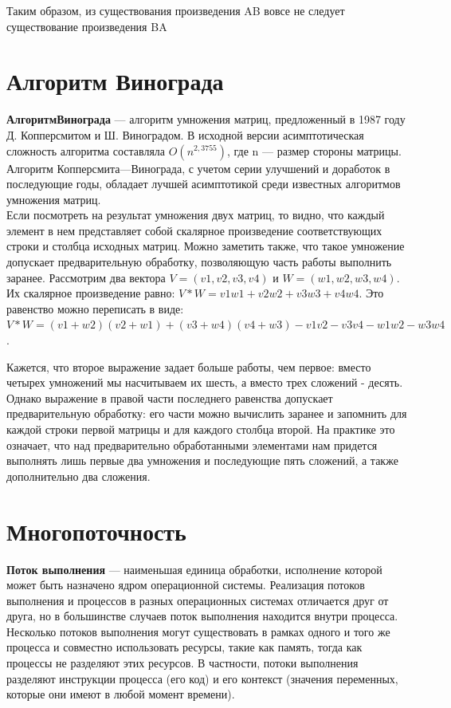 \documentclass[a4paper,12pt]{report}
\begin{document}
Таким образом, из существования произведения AB вовсе не следует существование произведения BA

\section{Алгоритм Винограда}
\hspace{0.6cm} \textbf {АлгоритмВинограда} — алгоритм умножения матриц, предложенный в 1987 году Д. Копперсмитом и Ш. Виноградом. В исходной версии асимптотическая сложность алгоритма составляла $O(n^{2,3755})$, где n — размер стороны матрицы. Алгоритм Копперсмита—Винограда, с учетом серии улучшений и доработок в последующие годы, обладает лучшей асимптотикой среди известных алгоритмов умножения матриц.\\
Если посмотреть на результат умножения двух матриц, то видно, что каждый элемент в нем представляет собой скалярное произведение соответствующих строки и столбца исходных матриц. Можно заметить также, что такое умножение допускает предварительную обработку, позволяющую часть работы выполнить заранее. 
Рассмотрим два вектора
$V = (v1, v2, v3, v4)$ и
$W = (w1, w2, w3, w4)$.
Их скалярное произведение равно: 
$V * W = v1w1 + v2w2 + v3w3 + v4w4$.
Это равенство можно переписать в виде: 
$V * W = (v1 + w2)(v2 + w1) + (v3 + w4)(v4 + w3) - v1v2 - v3v4 - w1w2 - w3w4$.

Кажется, что второе выражение задает больше работы, чем первое: вместо четырех умножений мы насчитываем их шесть, а вместо трех сложений - десять. Однако выражение в правой части последнего равенства допускает предварительную обработку: его части можно вычислить заранее и запомнить для каждой строки первой матрицы и для каждого столбца второй. На практике это означает, что над предварительно обработанными элементами нам придется выполнять лишь первые два умножения и последующие пять сложений, а также дополнительно два сложения.

\section{Многопоточность}
\hspace{0.6cm} \textbf {Поток выполнения} — наименьшая единица обработки, исполнение которой может быть назначено ядром операционной системы. Реализация потоков выполнения и процессов в разных операционных системах отличается друг от друга, но в большинстве случаев поток выполнения находится внутри процесса. Несколько потоков выполнения могут существовать в рамках одного и того же процесса и совместно использовать ресурсы, такие как память, тогда как процессы не разделяют этих ресурсов. В частности, потоки выполнения разделяют инструкции процесса (его код) и его контекст (значения переменных, которые они имеют в любой момент времени).
\end{document}
